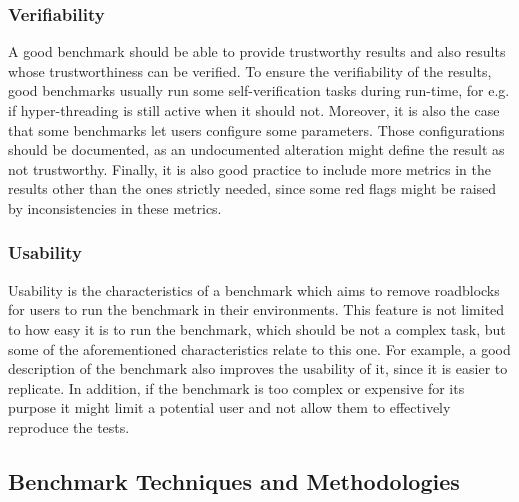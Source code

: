 \subsubsection{Verifiability}
A good benchmark should be able to provide trustworthy results and also results whose trustworthiness can be verified. To ensure the verifiability of the results, good benchmarks usually run some self-verification tasks during run-time, for e.g. if hyper-threading is still active when it should not. Moreover, it is also the case that some benchmarks let users configure some parameters. Those configurations should be documented, as an undocumented alteration might define the result as not trustworthy. \cite{how_to_bench}
Finally, it is also good practice to include more metrics in the results other than the ones strictly needed, since some red flags might be raised by inconsistencies in these metrics. 
\subsubsection{Usability}
Usability is the characteristics of a benchmark which aims to remove roadblocks for users to run the benchmark in their environments. This feature is not limited to how easy it is to run the benchmark, which should be not a complex task, but some of the aforementioned characteristics relate to this one. For example, a good description of the benchmark also improves the usability of it, since it is easier to replicate. In addition, if the benchmark is too complex or expensive for its purpose it might limit a potential user and not allow them to effectively reproduce the tests. 



\subsection{Benchmark Techniques and Methodologies}\label{BTaM}

